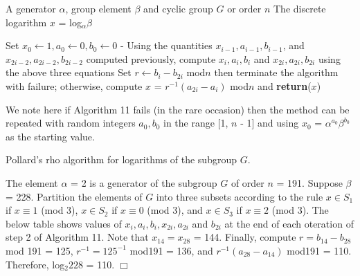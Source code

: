 \documentclass[iwp,first]{luthesis}
\begin{document}
\newpage

\begin{algorithm}
\caption{Pollard's $\rho$ algorithm for computing discrete logarithms}
\begin{algorithmic}
\REQUIRE A generator $\alpha$, group element $\beta$ and cyclic group $G$ or order $n$
\ENSURE The discrete logarithm $x$ = log$_{\alpha}\beta$
\begin{enumerate}
\STATE Set $x_0 \leftarrow 1, a_0 \leftarrow 0, b_0 \leftarrow 0$
\STATE - Using the quantities $x_{i-1}, a_{i-1}, b_{i-1}$, and $x_{2i-2}, a_{2i-2}, b_{2i-2}$ computed \STATE previously, compute $x_i, a_i, b_i$ and $x_{2i}, a_{2i}, b_{2i}$ using the above three equations
\STATE Set $r \leftarrow b_i - b_{2i}$ mod$n$
\STATE then terminate the algorithm with failure; 
\ENDIF
\STATE otherwise, compute $x$ = $r^{-1}(a_{2i} - a_i)$ mod$n$ and \textbf{return}($x$)
\ENDIF
\ENDFOR
\end{enumerate}
\end{algorithmic}
\end{algorithm}

We note here if Algorithm 11 fails (in the rare occasion) then the method can be repeated with random integers $a_0, b_0$ in the range [1, $n$ - 1] and using $x_0$ = $\alpha^{a_0}\beta^{b_0}$ as the starting value.

\begin{example}{Pollard's rho algorithm for logarithms of the subgroup $G$}.
\end{example}

The element $\alpha$ = 2 is a generator of the subgroup $G$ of order $n$ = 191. Suppose $\beta$ = 228. Partition the elements of $G$ into three subsets according to the rule $x \in S_1$ if $x \equiv 1$ (mod 3), $x \in S_2$ if $x \equiv 0$ (mod 3), and $x \in S_3$ if $x \equiv 2$ (mod 3). The below table shows values of $x_i, a_i, b_i, x_{2i}, a_{2i}$ and $b_{2i}$ at the end of each oteration of step 2 of Algorithm 11. Note that $x_{14} = x_{28}$ = 144. Finally, compute $r = b_{14} - b_{28}$ mod 191 = 125, $r^{-1} = 125^{-1}$ mod191 = 136, and $r^{-1}(a_{28}-a_{14})$ mod191 = 110. Therefore, log$_{2}228$ = 110.
\hfill $\Box$
\end{document}
